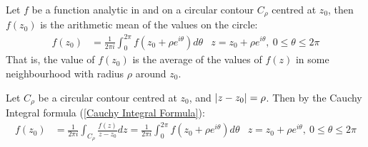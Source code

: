 \documentclass[12pt, english]{book}
\makeatletter
\renewenvironment{proof}[1][\proofname]{\par
	\pushQED{\qed}%
	\normalfont \topsep6\p@\@plus6\p@\relax
	\list{}{%
		\settowidth{\leftmargin}{\itshape\proofname:\hskip\labelsep}%
		\setlength{\labelwidth}{0pt}%
		\setlength{\itemindent}{-\leftmargin}%
		}%
	\item[\hskip\labelsep\itshape#1\@addpunct{:}]\ignorespaces
	}{\popQED\endlist\@endpefalse}
\makeatother
\begin{document}
	\begin{theorem}
		\label{Gauss's Mean Value Theorem - Complex}
		Let \(f\) be a function analytic in and on a circular contour \(C_\rho\) centred at \(z_0\), then \(f(z_0)\) is the arithmetic mean of the values on the circle:
		\begin{align*}
			f(z_0) &= \frac{1}{2\pi i} \int_{0}^{2\pi} f(z_0 + \rho e^{i\theta}) d\theta 
			& z=z_0 + \rho e^{i\theta}, \ 0\leq \theta \leq 2\pi
		\end{align*}
		That is, the value of \(f(z_0)\) is the average of the values of \(f(z)\) in some neighbourhood with radius \(\rho\) around \(z_0\).
	\end{theorem}
	\begin{proof}
		Let \(C_\rho\) be a circular contour centred at \(z_0\), and \(\abs{z-z_0} = \rho\). Then by the Cauchy Integral formula (\cref{Cauchy Integral Formula}):
		\begin{align*}
			f(z_0) &= \frac{1}{2\pi i} \int_{C_\rho} \frac{f(z)}{z-z_0} dz = \frac{1}{2\pi i} \int_{0}^{2\pi} f(z_0 + \rho e^{i\theta}) d\theta 
			& z=z_0 + \rho e^{i\theta}, \ 0\leq \theta \leq 2\pi
		\end{align*}
	\end{proof}
	
\end{document}
